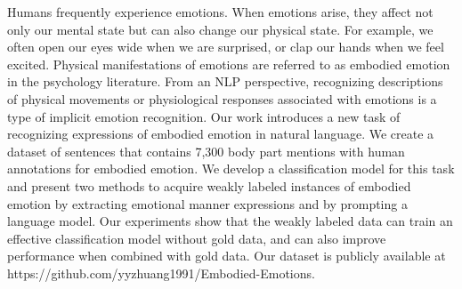 Humans frequently experience emotions. When emotions arise, they affect not only our mental state but can also change our physical state. For example, we often open our eyes wide when we are surprised, or clap our hands when we feel excited. Physical manifestations of emotions are referred to as embodied emotion in the psychology literature. From an NLP perspective, recognizing descriptions of physical movements or physiological responses associated with emotions is a type of implicit emotion recognition. Our work introduces a new task of recognizing expressions of embodied emotion in natural language. We create a  dataset of sentences that contains 7,300 body part mentions with human annotations for embodied emotion. We develop a classification model for this task and present two methods to acquire weakly labeled instances  of embodied emotion by extracting emotional manner expressions and by prompting a language model. Our experiments show that the weakly labeled data can  train an effective classification model without  gold data, and can  also improve performance when combined with gold data. Our dataset is publicly available at https://github.com/yyzhuang1991/Embodied-Emotions.